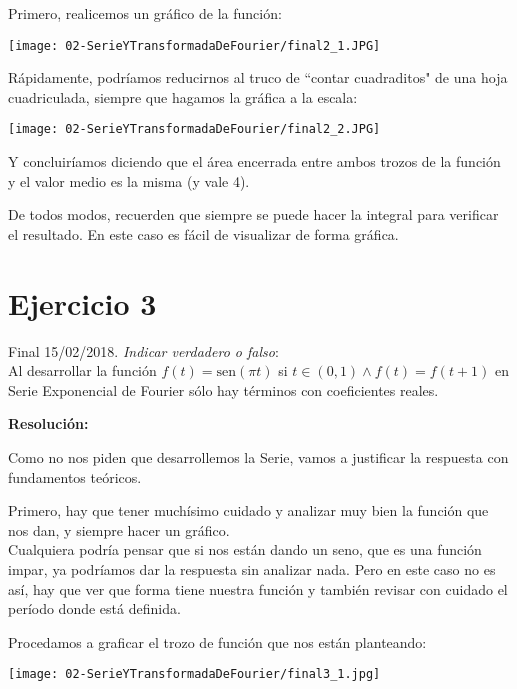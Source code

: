 \documentclass[11pt]{article}
\def\sen{\mathrm{sen}}
\begin{document}
	Primero, realicemos un gráfico de la función:
	\begin{center}
		\texttt{[image: 02-SerieYTransformadaDeFourier/final2\_1.JPG]}
	\end{center}

	Rápidamente, podríamos reducirnos al truco de ``contar cuadraditos" de una hoja cuadriculada, siempre que hagamos la gráfica a la escala:
	\begin{center}
		\texttt{[image: 02-SerieYTransformadaDeFourier/final2\_2.JPG]}
	\end{center}

	Y concluiríamos diciendo que el área encerrada entre ambos trozos de la función y el valor medio es la misma (y vale 4).
	
	De todos modos, recuerden que siempre se puede hacer la integral para verificar el resultado. En este caso es fácil de visualizar de forma gráfica.
	
	\pagebreak
	
	\section{Ejercicio 3}
	Final 15/02/2018. \textit{Indicar verdadero o falso}:\\
	Al desarrollar la función $f(t)=\sen\left(\pi t\right)$ si $t\in(0,1) \wedge f(t)=f(t+1)$ en Serie Exponencial de Fourier sólo hay términos con coeficientes reales.
	
	\textbf{Resolución:}
	
	Como no nos piden que desarrollemos la Serie, vamos a justificar la respuesta con fundamentos teóricos.
	
	Primero, hay que tener muchísimo cuidado y analizar muy bien la función que nos dan, y siempre hacer un gráfico.\\
	Cualquiera podría pensar que si nos están dando un seno, que es una función impar, ya podríamos dar la respuesta sin analizar nada. Pero en este caso no es así, hay que ver que forma tiene nuestra función y también revisar con cuidado el período donde está definida.
	
	Procedamos a graficar el trozo de función que nos están planteando: \\
	\begin{center}
		\texttt{[image: 02-SerieYTransformadaDeFourier/final3\_1.jpg]}
	\end{center}
\end{document}
